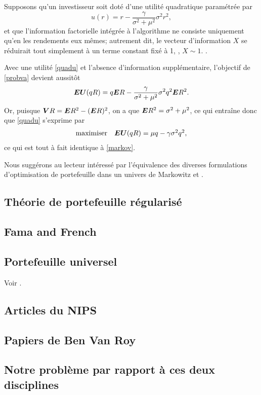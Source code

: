 Supposons qu'un investisseur soit doté d'une utilité quadratique paramétrée par
\begin{equation}
  \label{quadu}
  u(r) = r - \frac{\gamma}{\sigma^2+\mu^2}\sigma^2r^2,
\end{equation}
et que l'information factorielle intégrée à l'algorithme ne consiste uniquement qu'en les
rendements eux mêmes; autrement dit, le vecteur d'information $X$ se réduirait tout
simplement à un terme constant fixé à 1, \ie, $X\sim 1$. . 

Avec une utilité \eqref{quadu} et l'absence d'information supplémentaire, l'objectif de
\eqref{probva} devient aussitôt
\begin{equation}
  \label{euquad}
  \bm{EU}(qR) = q \bm E R - \frac{\gamma}{\sigma^2+\mu^2}\sigma^2 q^2\bm E R^2.
\end{equation}
Or, puisque $\bm V R = \bm E  R^2 - (\bm E R)^2$, on a que $\bm E R^2 = \sigma^2 + \mu^2$, ce qui entraîne
donc que \eqref{quadu} s'exprime par
\begin{equation}
  \begin{array}{ll}\mbox{maximiser} & {\bm{EU}(qR) = \mu q - \gamma\sigma^2 q^2,}\end{array}
\end{equation}
ce qui est tout à fait identique à \eqref{markov}.

Nous suggérons au lecteur intéressé par l'équivalence des diverses formulations
d'optimisation de portefeuille dans un univers de Markowitz \cite{bodnar2013equivalence}
et \cite{markowitz2014mean}.



\subsection{Théorie de portefeuille régularisé}

\cite{ban2016machine}

\subsection{Fama and French}

\cite{fama1993common}

\subsection{Portefeuille universel}

Voir \cite{cover1991universal,hazan2015online}.

\subsection{Articles du NIPS}

\subsection{Papiers de Ben Van Roy}

\subsection{Notre problème par rapport à ces deux disciplines}









